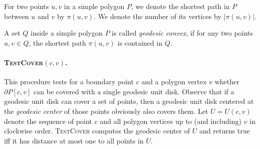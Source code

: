 \documentclass{llncs}
\begin{document}
\vspace{-10px}

{\center
{}
}


\begin{definition}
For two points $u,v$ in a simple polygon $P$, we denote the shortest path in $P$ between $u$ and $v$ by $\pi(u,v)$. We denote the number of its vertices by $|\pi(u,v)|$.
\end{definition}

\begin{definition}
A set $Q$ inside a simple polygon $P$ is called \emph{geodesic convex}, if for any two points $u,v \in Q$, the shortest path $\pi(u,v)$ is contained in $Q$. \end{definition}






\paragraph{\textbf{\textsc{TestCover}$(c, v)$.}}
This procedure tests for a boundary point $c$ and a polygon vertex $v$ whether $\partial P[c,v]$ can be covered with a single geodesic unit disk. Observe that if a geodesic unit disk {can cover} a set of points, then a geodesic unit disk centered at the \emph{geodesic center} of those points obviously  also covers them. Let $U = U(c,v)$ denote the sequence of point $c$ and all polygon vertices up to (and including) $v$ in clockwise order. \textsc{TestCover} computes the geodesic center of $U$ and returns true iff it has distance at most one to all points in $U$. \\
\end{document}
